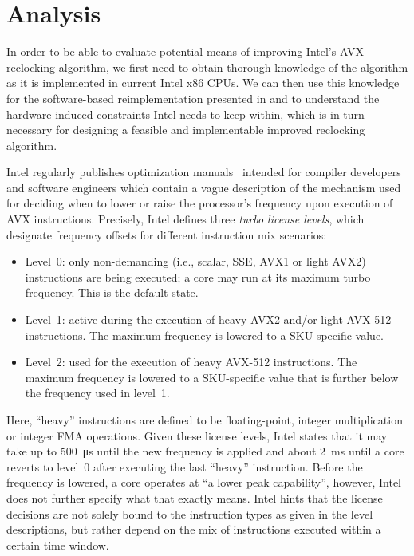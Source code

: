 \chapter{Analysis}
\label{sec:analysis}

In order to be able to evaluate potential means of improving Intel's \gls{AVX} reclocking algorithm, we first need to obtain thorough knowledge of the algorithm as it is implemented in current Intel x86 \glspl{CPU}. We can then use this knowledge for the software-based reimplementation presented in  and to understand the hardware-induced constraints Intel needs to keep within, which is in turn necessary for designing a feasible and implementable improved reclocking algorithm.

Intel regularly publishes optimization manuals~\cite{inteloptimizationmanual} intended for compiler developers and software engineers which contain a vague description of the mechanism used for deciding when to lower or raise the processor's frequency upon execution of \gls{AVX} instructions. Precisely, Intel defines three \textit{turbo license levels}, which designate frequency offsets for different instruction mix scenarios:

\begin{itemize}
	\item Level~0: only non-demanding (i.e., scalar, \gls{SSE}, \gls{AVX1} or light \gls{AVX2}) instructions are being executed; a core may run at its maximum turbo frequency. This is the default state.
	\item Level~1: active during the execution of heavy \gls{AVX2} and/or light \gls{AVX-512} instructions. The maximum frequency is lowered to a \gls{SKU}-specific value.
	\item Level~2: used for the execution of heavy \gls{AVX-512} instructions. The maximum frequency is lowered to a \gls{SKU}-specific value that is further below the frequency used in level~1.
\end{itemize}

\noindent Here, \enquote{heavy} instructions are defined to be floating-point, integer multiplication or integer \gls{FMA} operations. Given these license levels, Intel states that it may take up to \SI{500}{\micro\second} until the new frequency is applied and about \SI{2}{\milli\second} until a core reverts to level~0 after executing the last \enquote{heavy} instruction. Before the frequency is lowered, a core operates at \enquote{a lower peak capability}, however, Intel does not further specify what that exactly means. Intel hints that the license decisions are not solely bound to the instruction types as given in the level descriptions, but rather depend on the mix of instructions executed within a certain time window.

